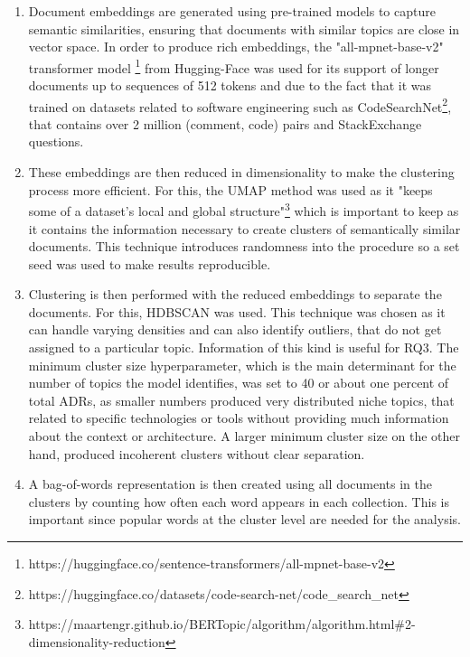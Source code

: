         \begin{enumerate}
            \item Document embeddings are generated using pre-trained models to capture semantic similarities, ensuring that documents with similar topics are close in vector space. In order to produce rich embeddings, the "all-mpnet-base-v2" transformer model \footnote{https://huggingface.co/sentence-transformers/all-mpnet-base-v2} from Hugging-Face was used for its support of longer documents up to sequences of 512 tokens and due to the fact that it was trained on datasets related to software engineering such as CodeSearchNet\footnote{https://huggingface.co/datasets/code-search-net/code_search_net}, that contains over 2 million (comment, code) pairs and StackExchange questions.
            
            \item These embeddings are then reduced in dimensionality to make the clustering process more efficient. For this, the UMAP method was used as it "keeps some of a dataset's local and global structure"\footnote{https://maartengr.github.io/BERTopic/algorithm/algorithm.html\#2-dimensionality-reduction} which is important to keep as it contains the information necessary to create clusters of semantically similar documents. This technique introduces randomness into the procedure so a set seed was used to make results reproducible.

            \item Clustering is then performed with the reduced embeddings to separate the documents. For this, HDBSCAN was used. This technique was chosen as it can handle varying densities and can also identify outliers, that do not get assigned to a particular topic. Information of this kind is useful for RQ3. The minimum cluster size hyperparameter, which is the main determinant for the number of  topics the model identifies, was set to 40 or about one percent of total ADRs, as smaller numbers produced very distributed niche topics, that related to specific technologies or tools without providing much information about the context or architecture. A larger minimum cluster size on the other hand, produced incoherent clusters without clear separation.

            \item A bag-of-words representation is then created using all documents in the clusters by counting how often each word appears in each collection. This is important since popular words at the cluster level are needed for the analysis. 


\end{enumerate}
